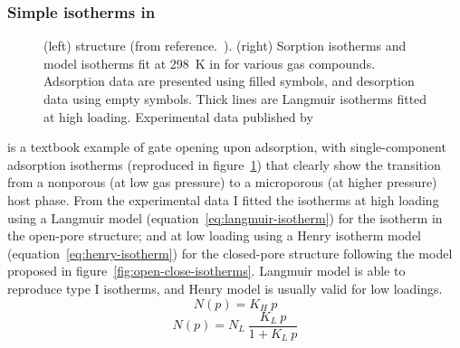 \documentclass[thesis]{subfiles}
\begin{document}
\subsubsection{Simple isotherms in \Cudhbc}

\begin{figure}[htp]
    \centering
    \hfill
    \raisebox{-0.5\height}{}
    \caption{(left) \Cudhbc structure (from reference.~\cite{Kitaura2003}). (right)
    Sorption isotherms and model isotherms fit at \SI{298}{K} in \Cudhbc for
    various gas compounds. Adsorption data are presented using filled symbols,
    and desorption data using empty symbols. Thick lines are Langmuir isotherms
    fitted at high loading. Experimental data published by
    \citeauthor{Kitaura2003}\cite{Kitaura2003}}
    \label{fig:cu-dhbc}
\end{figure}

\Cudhbc is a textbook example of gate opening upon adsorption, with
single-component adsorption isotherms (reproduced in figure~\ref{fig:cu-dhbc})
that clearly show the transition from a nonporous (at low gas pressure) to a
microporous (at higher pressure) host phase. From the experimental
data\cite{Kitaura2003} I fitted the isotherms at high loading using a Langmuir
model (equation~\eqref{eq:langmuir-isotherm}) for the isotherm in the open-pore
structure; and at low loading using a Henry isotherm model
(equation~\eqref{eq:henry-isotherm}) for the closed-pore structure following the
model proposed in figure~\ref{fig:open-close-isotherms}. Langmuir model is able
to reproduce type I isotherms, and Henry model is usually valid for low
loadings.
\[N(p) = K_H \ p \label{eq:henry-isotherm}\]
\[N(p) = N_L \ \frac{K_L \ p}{1 + K_L \ p} \label{eq:langmuir-isotherm}\]
\end{document}
